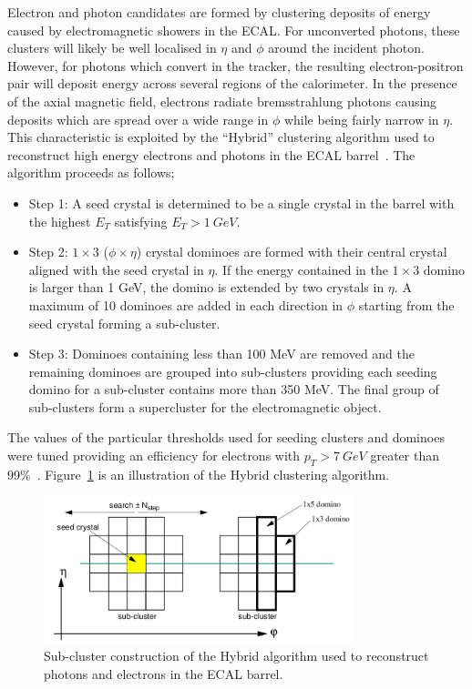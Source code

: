 Electron and photon candidates are formed by clustering deposits of 
energy caused by electromagnetic showers in the ECAL. For unconverted 
photons, these clusters will likely be well localised in $\eta$ and $\phi$
around the incident photon. However, for photons which convert in the tracker,
the resulting electron-positron pair will deposit energy across several regions
of the calorimeter. In the presence of the axial magnetic field, 
electrons radiate bremsstrahlung photons causing deposits which are 
spread over a wide range in $\phi$ while being fairly narrow in $\eta$.
This characteristic is exploited by the ``Hybrid'' clustering algorithm 
used to reconstruct high energy electrons and photons in
the ECAL barrel~\citep{cseez}. The algorithm proceeds as follows;
\begin{itemize}
 \item Step 1: A seed crystal is determined to be a single crystal in the barrel with the highest
 $E_{T}$ satisfying $E_{T}>1~GeV$.
 \item Step 2: $1\times3$ ($\phi\times\eta$) crystal dominoes are formed with their central crystal 
 aligned with the seed crystal in $\eta$. If the energy contained in the $1\times3$ domino is 
 larger than 1 GeV, the domino is extended by two crystals in $\eta$. A maximum of 10 dominoes are 
 added in each direction in $\phi$ starting from the seed crystal forming a sub-cluster.
 \item Step 3: Dominoes containing less than 100 MeV are removed and the remaining dominoes are 
 grouped into sub-clusters providing each seeding domino for a sub-cluster contains more than 350 MeV. 
 The final group of sub-clusters form a supercluster for the electromagnetic object.
\end{itemize}
The values of the particular thresholds used for seeding clusters and dominoes were tuned providing
an efficiency for electrons with $p_{T}>7~GeV$ greater than 99\%~\citep{dfutyan}.
Figure~\ref{fig:hybridclustering} is an illustration of the Hybrid clustering algorithm.

\begin{figure}
\begin{center}
	\includegraphics[width=0.8\textwidth]{detector/ecal/clustering.png}
	\caption{Sub-cluster construction of the Hybrid algorithm used to reconstruct photons and 
	electrons in the ECAL barrel.}
	\label{fig:hybridclustering}
\end{center}
\end{figure}

